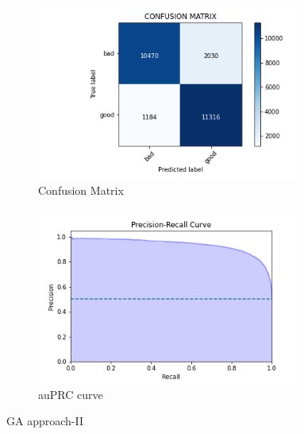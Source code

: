 \documentclass[conference]{IEEEtran}
\begin{document}
\begin{figure}[h!]
\begin{subfigure}{0.5\textwidth}
\centering
\includegraphics[width=0.95\textwidth]{genetic-type2/genetic-type-2-confusion-matrix.png}
\caption{Confusion Matrix}
\end{subfigure}%
\begin{subfigure}{0.5\textwidth}
\centering
\includegraphics[width=0.95\textwidth]{genetic-type2/Precision-Recall-Curve-genetic-type-2.png}
\caption{auPRC curve}
\end{subfigure}%
\caption{GA approach-II}
\end{figure}
\end{document}
